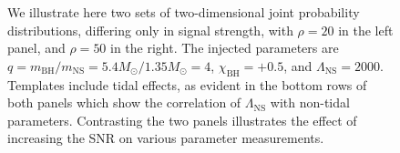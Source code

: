 \documentclass[aps,prd,amsmath,floats,floatfix, twocolumn,
superscriptaddress,nofootinbib,showpacs]{revtex4-1}
\newcommand{\lambdans}{\Lambda_\mathrm{NS}}
\newcommand{\chibh}{\chi_\mathrm{BH}}
\newcommand{\mbh}{m_\mathrm{BH}}
\newcommand{\mns}{m_\mathrm{NS}}
\begin{document}
\begin{appendix}
\begin{figure}
\caption{%
We illustrate here two sets of two-dimensional joint probability distributions,
differing only in signal strength, with $\rho=20$ in the left panel, and
$\rho=50$ in the right. The injected parameters are 
$q = \mbh/\mns = 5.4M_\odot/1.35M_\odot = 4$, $\chibh=+0.5$, and 
$\lambdans=2000$. Templates include tidal effects, as evident in the bottom rows
of both panels which show the correlation of $\lambdans$ with non-tidal 
parameters. Contrasting the two panels illustrates the effect of increasing the
SNR on various parameter measurements.
}
\label{fig:SingleSystemLambda2DPDFs}
\end{figure}



\end{appendix}
\end{document}
